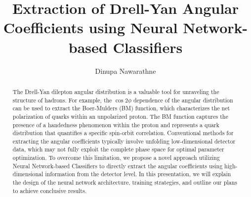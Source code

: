\documentclass{article}
\title{Extraction of Drell-Yan Angular Coefficients using Neural Network-based Classifiers}
\author{Dinupa Nawarathne}
\begin{document}
\maketitle

\begin{abstract}

The Drell-Yan dilepton angular distribution is a valuable tool for unraveling the structure of hadrons.
For example, the $\cos2\phi$ dependence of the angular distribution can be used to extract the Boer-Mulders (BM) function,
which characterizes the net polarization of quarks within an unpolarized proton.
The BM function captures the presence of a handedness phenomenon within the proton and represents a quark distribution
that quantifies a specific spin-orbit correlation. Conventional methods for extracting the angular coefficients typically
involve unfolding low-dimensional detector data, which may not fully exploit the complete phase space for optimal
parameter optimization. To overcome this limitation, we propose a novel approach utilizing Neural Network-based Classifiers to
directly extract the angular coefficients using high-dimensional information from the detector level. In this presentation,
we will explain the design of the neural network architecture, training strategies, and outline our plans to achieve conclusive results.

\end{abstract}
\end{document}
